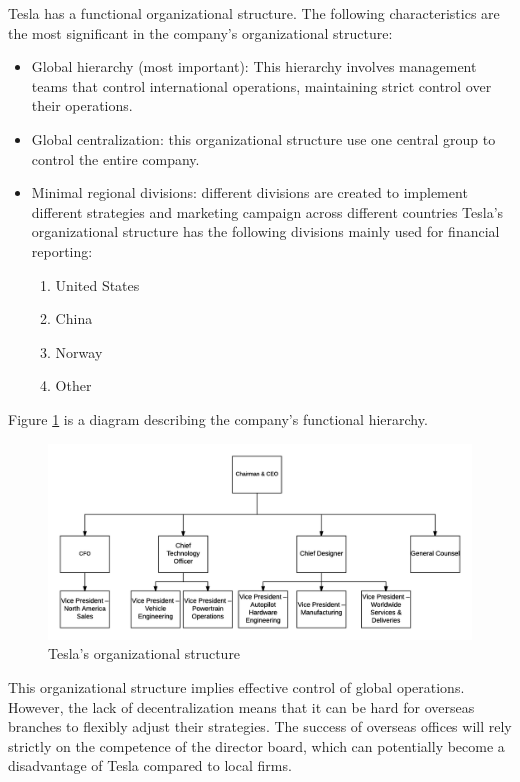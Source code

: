 \documentclass[12pt]{article}
\begin{document}
Tesla has a functional organizational structure. The following characteristics are the most significant in the company's organizational structure:

\begin{itemize}
	\item{Global hierarchy (most important): This hierarchy involves management teams that control international operations, maintaining strict control over their operations.}
	\item{Global centralization: this organizational structure use one central group to control the entire company.}
	\item{Minimal regional divisions: different divisions are created to implement different strategies and marketing campaign across different countries Tesla's organizational structure has the following divisions mainly used for financial reporting:
	\begin{enumerate}
		\item{United States}
		\item{China}
		\item{Norway}
		\item{Other}
	\end{enumerate}
	}
\end{itemize}

Figure \ref{structpic} is a diagram describing the company's functional hierarchy.

\begin{figure}
	\includegraphics[width=\textwidth]{TeslaStruct.png}
	\caption{Tesla's organizational structure\label{structpic}}
\end{figure}

This organizational structure implies effective control of global operations. However, the lack of decentralization means that it can be hard for overseas branches to flexibly adjust their strategies. The success of overseas offices will rely strictly on the competence of the director board, which can potentially become a disadvantage of Tesla compared to local firms.
\end{document}
